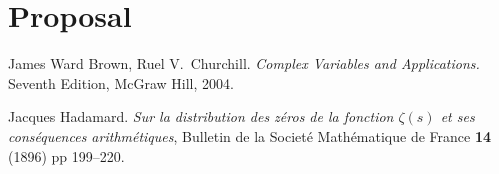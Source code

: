 \documentclass[11pt]{article}
\begin{document}
\bigskip 

\section*{Proposal}

\bigskip







\begin{thebibliography}{99}

 James Ward Brown, Ruel V.~Churchill. \textit{Complex Variables and Applications.} Seventh Edition, McGraw Hill, 2004.   

 Jacques Hadamard. \textit{Sur la distribution des z\'{e}ros de la fonction $\zeta(s)$ et ses cons\'{e}quences arithm\'{e}tiques}, Bulletin de la Societ\'{e} Math\'{e}matique de France \textbf{14} (1896) pp 199--220.


\end{thebibliography}






\end{document}

